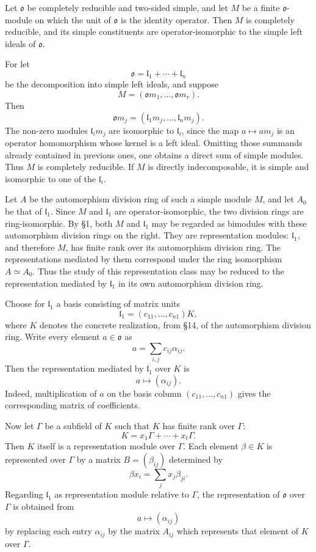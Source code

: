 \documentclass[
  11pt,
]{article}
\begin{document}
Let \(\mathfrak{o}\) be completely reducible and two-sided simple, and
let \(M\) be a finite \(\mathfrak{o}\)-module on which the unit of
\(\mathfrak{o}\) is the identity operator. Then \(M\) is completely
reducible, and its simple constituents are operator-isomorphic to the
simple left ideals of \(\mathfrak{o}\).

For let \[
  \mathfrak{o}=\mathfrak l_1+\cdots+\mathfrak l_n
\] be the decomposition into simple left ideals, and suppose \[
  M=(\mathfrak{o}m_1,\ldots,\mathfrak{o}m_r).
\] Then \[
  \mathfrak{o}m_j=(\mathfrak l_1m_j,\ldots,\mathfrak l_nm_j).
\] The non-zero modules \(\mathfrak l_i m_j\) are isomorphic to
\(\mathfrak l_i\), since the map \(a\mapsto am_j\) is an operator
homomorphism whose kernel is a left ideal. Omitting those summands
already contained in previous ones, one obtains a direct sum of simple
modules. Thus \(M\) is completely reducible. If \(M\) is directly
indecomposable, it is simple and isomorphic to one of the
\(\mathfrak l_i\).

Let \(A\) be the automorphism division ring of such a simple module
\(M\), and let \(A_0\) be that of \(\mathfrak l_1\). Since \(M\) and
\(\mathfrak l_1\) are operator-isomorphic, the two division rings are
ring-isomorphic. By §1, both \(M\) and \(\mathfrak l_1\) may be regarded
as bimodules with these automorphism division rings on the right. They
are representation modules: \(\mathfrak l_1\), and therefore \(M\), has
finite rank over its automorphism division ring. The representations
mediated by them correspond under the ring isomorphism \(A\simeq A_0\).
Thus the study of this representation class may be reduced to the
representation mediated by \(\mathfrak l_1\) in its own automorphism
division ring.

Choose for \(\mathfrak l_1\) a basis consisting of matrix units \[
  \mathfrak l_1=(c_{11},\ldots,c_{n1})K,
\] where \(K\) denotes the concrete realization, from §14, of the
automorphism division ring. Write every element \(a\in\mathfrak{o}\) as
\[
  a=\sum_{i,j} c_{ij}\alpha_{ij}.
\] Then the representation mediated by \(\mathfrak l_1\) over \(K\) is
\[
  a\mapsto (\alpha_{ij}).
\] Indeed, multiplication of \(a\) on the basis column
\((c_{11},\ldots,c_{n1})\) gives the corresponding matrix of
coefficients.

Now let \(\Gamma\) be a subfield of \(K\) such that \(K\) has finite
rank over \(\Gamma\): \[
  K=x_1\Gamma+\cdots+x_t\Gamma.
\] Then \(K\) itself is a representation module over \(\Gamma\). Each
element \(\beta\in K\) is represented over \(\Gamma\) by a matrix
\(B=(\beta_{ij})\) determined by \[
  \beta x_i=\sum_j x_j\beta_{ji}.
\] Regarding \(\mathfrak l_1\) as representation module relative to
\(\Gamma\), the representation of \(\mathfrak{o}\) over \(\Gamma\) is
obtained from \[
  a\mapsto (\alpha_{ij})
\] by replacing each entry \(\alpha_{ij}\) by the matrix \(A_{ij}\)
which represents that element of \(K\) over \(\Gamma\).
\end{document}
